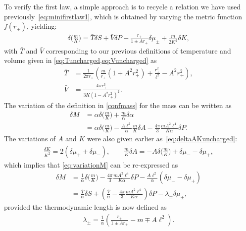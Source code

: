 \documentclass[
twoside,
openright,
frontopenright,
]{dmathesis}
\newcommand{\nn}{\nonumber}
\begin{document}
To verify the first law, a simple approach is to recycle a relation we have used
previously~\eqref{eq:minifirstlaw1}, which is obtained by varying the metric
function $f(r_+)$, yielding:
\begin{align}
  \label{eq:deltamK}
  \delta \Big(\frac{m}{K}\Big) = \bar{T} \delta S + \bar{V} \delta P -
  \frac{r_+}{1\pm Ar_+}\delta \mu_\pm + \frac{m}{2K^2}\delta K,
\end{align}
with $\bar{T}$ and $\bar{V}$ corresponding to our previous definitions of
temperature and volume given in \cref{eq:Tuncharged,eq:Vuncharged} as
\begin{align}
  \bar{T} &= \frac{1}{2\pi r_+}\left(\frac{m}{r_+}\left(1+A^2r_+^2
\right) + \frac{r_+^2}{\ell^2} - A^2 r_+^2\right),\nn\\
\bar{V} &= \frac{4\pi r_+^3}{3K(1-A^2r_+^2)^2}.
\end{align}
The variation of the definition in \cref{confmass} for the mass can be written
as
\begin{align}
  \label{eq:variationM}
  \delta M &= \alpha \delta \Big(\frac{m}{K}\Big) + \frac{m}{K}\delta \alpha\nn\\
           &= \alpha \delta \Big(\frac{m}{K}\Big) - \frac{A\ell^2}{\alpha}\frac{m}{K}\delta A - \frac{4\pi}{3} \frac{mA^2\ell^4}{K\alpha} \delta P. 
\end{align}
The variations of $A$ and $K$ were also given earlier
as~\eqref{eq:deltaAKuncharged}:
\begin{align}
  \frac{\delta K}{K^2} = 2  ( \delta \mu_+ + \delta \mu_-  ), \qquad \frac{m}{K}
  \delta A = - A \delta \Big(\frac{m}{K}\Big)  
 + \delta \mu_- - \delta \mu_+,
\end{align}
which implies that \cref{eq:variationM} can be re-expressed as
\begin{align}
  \label{eq:finalfirstlaw}
  \delta M & = \frac{1}{\alpha} \delta\Big(\frac{m}{K}\Big) - \frac{4\pi}{3}
             \frac{mA^2\ell^4}{K\alpha} \delta P -
             \frac{A\ell^2}{\alpha}(\delta\mu_- - \delta\mu_+)\nn\\
           &=\frac{\bar{T}}{\alpha}\delta S + \left(\frac{\bar{V}}{\alpha}-
             \frac{4\pi}{3} \frac{mA^2\ell^4}{K\alpha}\right) \delta P -
             \lambda_\pm \delta\mu_\pm,
\end{align}
provided the thermodynamic length is now defined as
\begin{align}
  \lambda_\pm = \frac{1}{\alpha}\left(\frac{r_+}{1\pm Ar_+}-m \mp A\ell^2\right).
\end{align}
\end{document}
